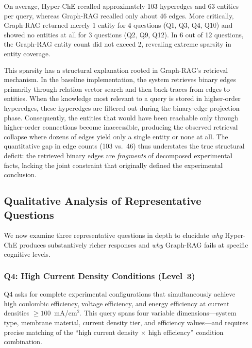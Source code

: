 On average, Hyper-ChE recalled approximately 103 hyperedges and 63 entities per query, whereas Graph-RAG recalled only about 46 edges. More critically, Graph-RAG returned merely 1 entity for 4 questions (Q1, Q3, Q4, Q10) and showed no entities at all for 3 questions (Q2, Q9, Q12). In 6 out of 12 questions, the Graph-RAG entity count did not exceed 2, revealing extreme sparsity in entity coverage.

This sparsity has a structural explanation rooted in Graph-RAG's retrieval mechanism. In the baseline implementation, the system retrieves binary edges primarily through relation vector search and then back-traces from edges to entities. When the knowledge most relevant to a query is stored in higher-order hyperedges, these hyperedges are filtered out during the binary-edge projection phase. Consequently, the entities that would have been reachable only through higher-order connections become inaccessible, producing the observed retrieval collapse where dozens of edges yield only a single entity or none at all. The quantitative gap in edge counts (103 vs.~46) thus understates the true structural deficit: the retrieved binary edges are \emph{fragments} of decomposed experimental facts, lacking the joint constraint that originally defined the experimental conclusion.

\subsection{Qualitative Analysis of Representative Questions}
\label{subsec:flow_battery_qualitative}

We now examine three representative questions in depth to elucidate \emph{why} Hyper-ChE produces substantively richer responses and \emph{why} Graph-RAG fails at specific cognitive levels.

\subsubsection{Q4: High Current Density Conditions (Level~3)}

Q4 asks for complete experimental configurations that simultaneously achieve high coulombic efficiency, voltage efficiency, and energy efficiency at current densities $\geq 100$~mA/cm$^2$. This query spans four variable dimensions---system type, membrane material, current density tier, and efficiency values---and requires precise matching of the ``high current density $\times$ high efficiency'' condition combination.

